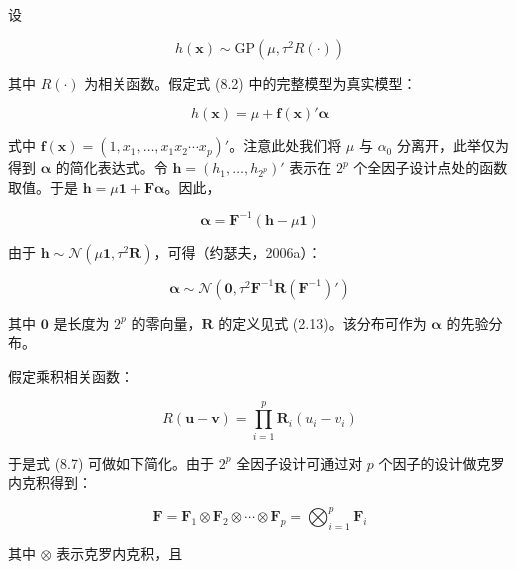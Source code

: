 \documentclass{ctexart}
\begin{document}
设

\begin{equation*}
h(\boldsymbol{x})\sim\mathrm{GP}(\mu,\tau^2R(\cdot))
\end{equation*}

其中 $R(\cdot)$ 为相关函数。假定式 (8.2) 中的完整模型为真实模型：

\begin{equation*}
h(\boldsymbol{x})=\mu+\boldsymbol{f}(\boldsymbol{x})'\boldsymbol{\alpha}
\tag{8.6}
\end{equation*}

式中 $\boldsymbol{f}(\boldsymbol{x})=(1,x_1,\dots,x_1x_2\cdots x_p)'$。注意此处我们将 $\mu$ 与 $\alpha_0$ 分离开，此举仅为得到 $\boldsymbol{\alpha}$ 的简化表达式。令 $\boldsymbol{h}=(h_1,\dots,h_{2^p})'$ 表示在 $2^p$ 个全因子设计点处的函数取值。于是 $\boldsymbol{h}=\mu\boldsymbol{1}+\boldsymbol{F}\boldsymbol{\boldsymbol{\alpha}}$。因此，

\begin{equation*}
\boldsymbol{\boldsymbol{\alpha}}=\boldsymbol{F}^{-1}(\boldsymbol{h}-\mu\boldsymbol{1})
\end{equation*}

由于 $\boldsymbol{h}\sim\mathcal{N}(\mu\boldsymbol{1},\tau^2\boldsymbol{R})$，可得（约瑟夫，2006a）：

\begin{equation*}
\boldsymbol{\boldsymbol{\alpha}}\sim\mathcal{N}\left(\boldsymbol{0},\tau^2\boldsymbol{F}^{-1}\boldsymbol{R}(\boldsymbol{F}^{-1})'\right)
\tag{8.7}
\end{equation*}

其中 $\boldsymbol{0}$ 是长度为 $2^p$ 的零向量，$\boldsymbol{R}$ 的定义见式 (2.13)。该分布可作为 $\boldsymbol{\boldsymbol{\alpha}}$ 的先验分布。

假定乘积相关函数：

\begin{equation*}
R(\boldsymbol{u}-\boldsymbol{v})=\prod_{i=1}^{p}\boldsymbol{R}_i(u_i-v_i)
\tag{8.8}
\end{equation*}

于是式 (8.7) 可做如下简化。由于 $2^p$ 全因子设计可通过对 $p$ 个因子的设计做克罗内克积得到：

\begin{equation*}
\boldsymbol{F}=\boldsymbol{F}_1\otimes \boldsymbol{F}_2\otimes\cdots\otimes \boldsymbol{F}_p=\bigotimes_{i=1}^{p}\boldsymbol{F}_i
\end{equation*}

其中 $\otimes$ 表示克罗内克积，且
\end{document}
